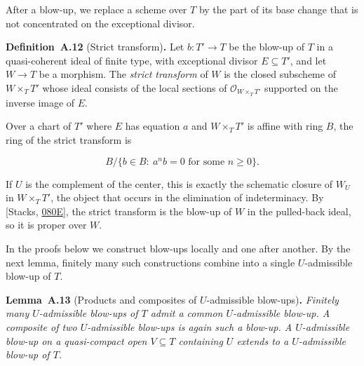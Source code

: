 \documentclass[11pt]{article}
\newenvironment{bpstatement}[2]{\par\addvspace{0.6\baselineskip}\noindent\textbf{#1}#2\textbf{.}\enspace\ignorespaces}
  {\par\addvspace{0.4\baselineskip}}
\newenvironment{bpstatementit}[2]{\begin{bpstatement}{#1}{#2}\itshape\ignorespaces}{\end{bpstatement}}
\begin{document}
\label{bp30}%
After a blow-up, we replace a scheme over \(T\) by the part of its base change that is not concentrated on the exceptional divisor.

\label{bp31}%
\begin{bpstatement}{Definition~A.12}{ (Strict transform)}
Let \(b:T'\to T\) be the blow-up of \(T\) in a quasi-coherent ideal of finite type, with exceptional divisor \(E\subseteq T'\), and let \(W\to T\) be a morphism. The \emph{strict transform} of \(W\) is the closed subscheme of \(W\times_TT'\) whose ideal consists of the local sections of \(\mathcal O_{W\times_TT'}\) supported on the inverse image of \(E\).
\end{bpstatement}

\label{bp32}%
Over a chart of \(T'\) where \(E\) has equation \(a\) and \(W\times_TT'\) is affine with ring \(B\), the ring of the strict transform is

\[
B/\{b\in B:\ a^nb=0\text{ for some }n\geq0\}.
\]

If \(U\) is the complement of the center, this is exactly the schematic closure of \(W_U\) in \(W\times_TT'\), the object that occurs in the elimination of indeterminacy. By [Stacks, \href{https://stacks.math.columbia.edu/tag/080E}{080E}], the strict transform is the blow-up of \(W\) in the pulled-back ideal, so it is proper over \(W\).

In the proofs below we construct blow-ups locally and one after another. By the next lemma, finitely many such constructions combine into a single \(U\)-admissible blow-up of \(T\).

\label{bp33}%
\begin{bpstatementit}{Lemma~A.13}{ (Products and composites of $U$-admissible blow-ups)}
Finitely many \(U\)-admissible blow-ups of \(T\) admit a common \(U\)-admissible blow-up. A composite of two \(U\)-admissible blow-ups is again such a blow-up. A \(U\)-admissible blow-up on a quasi-compact open \(V\subseteq T\) containing \(U\) extends to a \(U\)-admissible blow-up of \(T\).
\end{bpstatementit}
\end{document}
